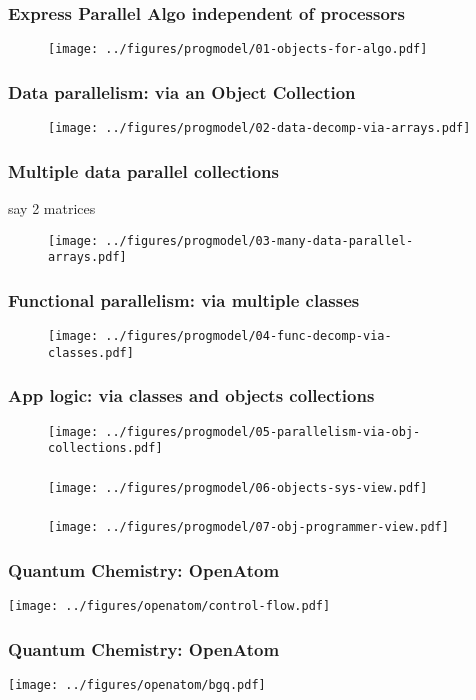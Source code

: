 \begin{frame}
  \frametitle{Express Parallel Algo independent of processors}
  \begin{figure}\texttt{[image: ../figures/progmodel/01-objects-for-algo.pdf]}\end{figure}
\end{frame}


\begin{frame}
  \frametitle{Data parallelism: via an Object Collection}
  \begin{figure}\texttt{[image: ../figures/progmodel/02-data-decomp-via-arrays.pdf]}\end{figure}
\end{frame}


\begin{frame}
  \frametitle{Multiple data parallel collections}
say 2 matrices
  \begin{figure}\texttt{[image: ../figures/progmodel/03-many-data-parallel-arrays.pdf]}\end{figure}
\end{frame}


\begin{frame}
  \frametitle{Functional parallelism: via multiple classes}
  \begin{figure}\texttt{[image: ../figures/progmodel/04-func-decomp-via-classes.pdf]}\end{figure}
\end{frame}


\begin{frame}
  \frametitle{App logic: via classes and objects collections}
  \begin{figure}\texttt{[image: ../figures/progmodel/05-parallelism-via-obj-collections.pdf]}\end{figure}
\end{frame}


\begin{frame}
  \frametitle{
  }
  \begin{figure}\texttt{[image: ../figures/progmodel/06-objects-sys-view.pdf]}\end{figure}
\end{frame}


\begin{frame}
  \frametitle{
  }
  \begin{figure}\texttt{[image: ../figures/progmodel/07-obj-programmer-view.pdf]}\end{figure}
\end{frame}


\begin{frame}
\frametitle{Quantum Chemistry: OpenAtom}
\texttt{[image: ../figures/openatom/control-flow.pdf]}
\end{frame}


\begin{frame}
\frametitle{Quantum Chemistry: OpenAtom}
\texttt{[image: ../figures/openatom/bgq.pdf]}
\end{frame}


